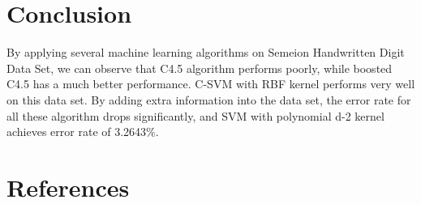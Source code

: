 \documentclass[a4paper,11pt]{article}
\begin{document}
\section{Conclusion}
By applying several machine learning algorithms on Semeion Handwritten Digit Data Set, we can observe that C4.5 algorithm performs poorly, while boosted C4.5 has a much better performance. C-SVM with RBF kernel performs very well on this data set. By adding extra information into the data set, the error rate for all these algorithm drops significantly, and SVM with polynomial d-2 kernel achieves error rate of 3.2643\%.
\section{References}
\end{document}
